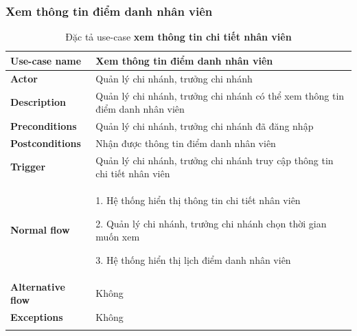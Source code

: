         \newpage
        \subsubsection{Xem thông tin điểm danh nhân viên}
            \begin{longtable}{| p{} | p{} |} 
                \hline
                    \textbf{Use-case name} 
                & 
                    Xem thông tin điểm danh nhân viên
                \\
                \hline
                    \textbf{Actor} 
                & 
                    Quản lý chi nhánh, trưởng chi nhánh
                \\
                \hline
                    \textbf{Description} 
                & 
                    Quản lý chi nhánh, trưởng chi nhánh có thể xem thông tin điểm danh nhân viên
                \\
                \hline
                    \textbf{Preconditions} 
                &
                    Quản lý chi nhánh, trưởng chi nhánh đã đăng nhập 
                \\
                \hline
                    \textbf{Postconditions} 
                & 
                    Nhận được thông tin điểm danh nhân viên
                \\
                \hline
                    \textbf{Trigger} 
                & 
                    Quản lý chi nhánh, trưởng chi nhánh truy cập thông tin chi tiết nhân viên
                \\
                \hline
                \begin{flushleft}
                    \textbf{Normal flow}
                \end{flushleft}
                & 
                1. Hệ thống hiển thị thông tin chi tiết nhân viên
                
                    2. Quản lý chi nhánh, trưởng chi nhánh chọn thời gian muốn xem
                    
                    3. Hệ thống hiển thị lịch điểm danh nhân viên
                \\
                \hline
                    \textbf{Alternative flow}
                &
                    Không
                \\
                \hline
                    \textbf{Exceptions} 
                &
                    Không
                \\
                \hline
                \caption{Đặc tả use-case \textbf{xem thông tin chi tiết nhân viên}}
            \end{longtable}
    
